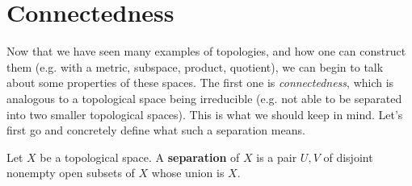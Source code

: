\section{Connectedness} 

  Now that we have seen many examples of topologies, and how one can construct them (e.g. with a metric, subspace, product, quotient), we can begin to talk about some properties of these spaces. The first one is \textit{connectedness}, which is analogous to a topological space being irreducible (e.g. not able to be separated into two smaller topological spaces). This is what we should keep in mind. Let's first go and concretely define what such a separation means.

  \begin{definition}[Separation]
    \label{def:separation}
    Let $X$ be a topological space. A \textbf{separation} of $X$ is a pair $U, V$ of disjoint nonempty open subsets of $X$ whose union is $X$. 
  \end{definition}

